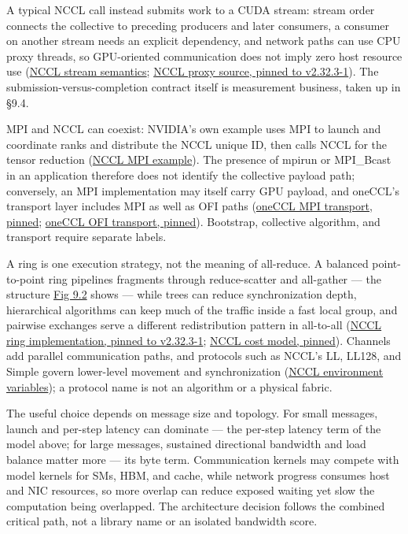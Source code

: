 A typical NCCL call instead submits work to a CUDA stream: stream order
connects the collective to preceding producers and later consumers, a
consumer on another stream needs an explicit dependency, and network
paths can use CPU proxy threads, so GPU-oriented communication does not
imply zero host resource use
(\href{https://docs.nvidia.com/deeplearning/nccl/user-guide/docs/usage/streams.html}{NCCL
stream semantics};
\href{https://raw.githubusercontent.com/NVIDIA/nccl/v2.32.3-1/src/proxy.cc}{NCCL
proxy source, pinned to v2.32.3-1}). The submission-versus-completion
contract itself is measurement business, taken up in §9.4.

MPI and NCCL can coexist: NVIDIA's own example uses MPI to launch and
coordinate ranks and distribute the NCCL unique ID, then calls NCCL for
the tensor reduction
(\href{https://docs.nvidia.com/deeplearning/nccl/user-guide/docs/examples.html}{NCCL
MPI example}). The presence of mpirun or MPI\_Bcast in an application
therefore does not identify the collective payload path; conversely, an
MPI implementation may itself carry GPU payload, and oneCCL's transport
layer includes MPI as well as OFI paths
(\href{https://raw.githubusercontent.com/uxlfoundation/oneCCL/2022.1.0/deps/libccl/src/atl/mpi/atl_mpi.cpp}{oneCCL
MPI transport, pinned};
\href{https://raw.githubusercontent.com/uxlfoundation/oneCCL/2022.1.0/deps/libccl/src/atl/ofi/atl_ofi.cpp}{oneCCL
OFI transport, pinned}). Bootstrap, collective algorithm, and transport
require separate labels.

A ring is one execution strategy, not the meaning of all-reduce. A
balanced point-to-point ring pipelines fragments through reduce-scatter
and all-gather --- the structure \hyperref[fig:9.2]{Fig 9.2} shows --- while trees can
reduce synchronization depth, hierarchical algorithms can keep much of
the traffic inside a fast local group, and pairwise exchanges serve a
different redistribution pattern in all-to-all
(\href{https://raw.githubusercontent.com/NVIDIA/nccl/v2.32.3-1/src/device/all_reduce.h}{NCCL
ring implementation, pinned to v2.32.3-1};
\href{https://raw.githubusercontent.com/NVIDIA/nccl/v2.32.3-1/src/tuning/cost_model.cc}{NCCL
cost model, pinned}). Channels add parallel communication paths, and
protocols such as NCCL's LL, LL128, and Simple govern lower-level
movement and synchronization
(\href{https://docs.nvidia.com/deeplearning/nccl/user-guide/docs/env.html}{NCCL
environment variables}); a protocol name is not an algorithm or a
physical fabric.

The useful choice depends on message size and topology. For small
messages, launch and per-step latency can dominate --- the per-step
latency term of the model above; for large messages, sustained
directional bandwidth and load balance matter more --- its byte term.
Communication kernels may compete with model kernels for SMs, HBM, and
cache, while network progress consumes host and NIC resources, so more
overlap can reduce exposed waiting yet slow the computation being
overlapped. The architecture decision follows the combined critical
path, not a library name or an isolated bandwidth score.


